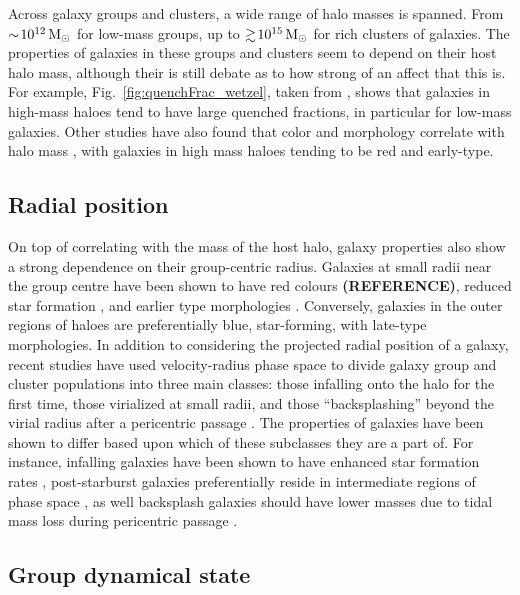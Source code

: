 Across galaxy groups and clusters, a wide range of halo masses is
spanned.  From $\sim\! 10^{12}\,\mathrm{M_{\odot}}$ for low-mass groups, up to
$\gtrsim\! 10^{15}\,\mathrm{M_{\odot}}$ for rich clusters of galaxies.  The
properties of galaxies in these groups and clusters seem to depend on
their host halo mass, although their is still debate as to how strong
of an affect that this is.  For example,
Fig.~\ref{fig:quenchFrac_wetzel}, taken from \citet{wetzel2012}, shows
that galaxies in high-mass haloes tend to have large quenched
fractions, in particular for low-mass galaxies.  Other studies have
also found that color and morphology correlate with halo mass
\citep[e.g.][]{kimm2009}, with galaxies in high mass haloes tending to
be red and early-type.

\subsection{Radial position}
\label{sec:radial_pos}

On top of correlating with the mass of the host halo, galaxy
properties also show a strong dependence on their group-centric
radius.  Galaxies at small radii near the group centre have been shown
to have red colours \textbf{(REFERENCE)}, reduced star formation
\citep{rasmussen2012, wetzel2012, haines2015}, and earlier type
morphologies
\citep{whitmore1993, goto2003, postman2005, fasano2015}.  Conversely, galaxies in the outer regions of
haloes are preferentially blue, star-forming, with late-type
morphologies.  In addition to considering the projected radial
position of a galaxy, recent studies have used velocity-radius phase
space to divide galaxy group and cluster populations into three main
classes: those infalling onto the halo for the first time, those
virialized at small radii, and those ``backsplashing'' beyond the
virial radius after a pericentric passage
\citep[e.g.][]{mahajan2011}.  The
properties of galaxies have been shown to differ based upon which of
these subclasses they are a part of.  For instance, infalling galaxies
have been shown to have enhanced star formation rates \citep{noble2016}, post-starburst galaxies preferentially reside in
intermediate regions of phase space \citep{muzzin2014}, as well
backsplash galaxies should have lower masses due to tidal mass loss
during pericentric passage \citep{gill2005}.  

\subsection{Group dynamical state}
\label{sec:dyn_state}

